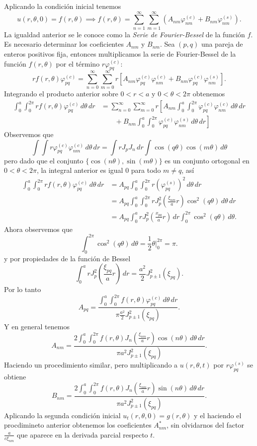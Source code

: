 \documentclass[11pt,letterpaper,draft]{report}
\newcommand\<{\langle}
\renewcommand\>{\rangle}
\renewcommand\phi\varphi
\begin{document}
Aplicando la condición inicial tenemos
\[
  u(r,\theta,0) = f(r,\theta)
  \implies
  f(r,\theta) = \sum_{n=1}^\infty\sum_{m=1}^\infty
            \left(
            A_{nm}\phi_{nm}^{(c)}
            + B_{nm}\phi_{nm}^{(s)}
            \right).
\] La igualdad anterior se le conoce como la \textit{Serie de Fourier-Bessel}
de la función $f$. Es necesario determinar los coeficientes $A_{nm}$
y $B_{nm}$. Sea $(p,q)$ una pareja de enteros positivos fija, 
entonces multiplicamos la serie de Fourier-Bessel de la función 
$f(r,\theta)$ por el término $r\phi_{pq}^{(c)}$:
\[
  rf(r,\theta)\phi_{pq}^{(c)} =
  \sum_{n=0}^\infty\sum_{m=0}^\infty
  r\left[
  A_{nm}\phi_{pq}^{(c)}\phi_{nm}^{(c)}
  + B_{nm}\phi_{pq}^{(c)}\phi_{nm}^{(s)}
  \right].
\] Integrando el producto anterior sobre $0 < r < a$ y $0 < \theta < 2\pi$ obtenemos
\begin{align*}
  \int_{0}^{a} \int_{0}^{2\pi} rf(r,\theta)\phi_{pq}^{(c)} \, d\theta \, dr &= 
  \sum_{n=0}^\infty\sum_{m=0}^\infty
  r \left[
    A_{nm} \int_{0}^{a} \int_{0}^{2\pi} \phi_{pq}^{(c)}\phi_{nm}^{(c)} \, d\theta \, dr \right.\\
  &\quad\quad + \left.
B_{nm} \int_{0}^{a} \int_{0}^{2\pi} \phi_{pq}^{(c)}\phi_{nm}^{(s)} \, d\theta \, dr\right]
\end{align*}
Observemos que
\[
  \int \int r\phi_{pq}^{(c)}\phi_{nm}^{(c)} \, d\theta \, dr = \int r J_p J_n \, dr \int \cos(q\theta)\cos(m\theta) \, d\theta
\] pero dado que el conjunto $\{\cos(n\theta), \sin(m\theta)\}$ es un conjunto ortogonal en $0 < \theta < 2\pi$, la integral anterior es igual 0 para todo $m \neq q$, así
\begin{align*}
  \int_{0}^{a} \int_{0}^{2\pi} rf(r,\theta)\phi_{pq}^{(c)} \, d\theta \, dr &=
  A_{pq} \int_{0}^{a} \int_{0}^{2\pi} r\left(\phi_{pq}^{(s)}\right)^2 \, d\theta \, dr\\
  &= A_{pq} \int_{0}^{a} \int_{0}^{2\pi} r J_p^2\left(\frac{\xi_{nm}}{a}r\right)\cos^2(q\theta) \, d\theta \, dr\\
  &= A_{pq} \int_{0}^{a} r J_p^2\left(\frac{x_{pq}}{a}r\right) \, dr \int_{0}^{2\pi} \cos^2(q\theta) \, d\theta.
\end{align*}
Ahora observemos que
\[
  \int_{0}^{2\pi} \cos^2(q\theta) \, d\theta = \frac{1}{2}\theta\bigg|_0^{2\pi} = \pi.
\] y por propiedades de la función de Bessel
\[
  \int_{0}^{a} r J_p^2\left(\frac{\xi_{pq}}{a}r\right) \, dr = \frac{a^2}{2} J_{p\pm1}^2\left(\xi_{pq}\right).
\] Por lo tanto
\[
  A_{pq} = \frac{\int_{0}^{a} \int_{0}^{2\pi} f(r,\theta)\phi_{pq}^{(c)} \, d\theta \, dr}{\pi \frac{a^2}{2} J_{p\pm1}^2(\xi_{pq})}.
\] Y en general tenemos
\[
  A_{nm} = \frac{2\int_{0}^{a} \int_{0}^{2\pi} f(r,\theta) J_n\left(\frac{\xi_{nm}}{a}r\right)\cos(n\theta) \, d\theta \, dr}{\pi a^2 J_{p\pm1}^2(\xi_{pq})}.
\] Haciendo un procedimiento similar, pero multiplicando a $u(r,\theta,t)$ por $r\phi_{pq}^{(s)}$ se obtiene
\[
  B_{nm} = \frac{2\int_{0}^{a} \int_{0}^{2\pi} f(r,\theta) J_n\left(\frac{\xi_{nm}}{a}r\right)\sin(n\theta) \, d\theta \, dr}{\pi a^2 J_{p\pm1}^2(\xi_{pq})}.
\] Aplicando la segunda condición inicial $u_t(r,\theta,0) = g(r,\theta)$ y el haciendo el procdimineto anterior obtenemos los coeficientes $A_{nm}^{\ast}$, sin olvidarnos del factor $\frac{a}{c\xi_{nm}}$ que aparece en la derivada parcial respecto $t$.
\end{document}
